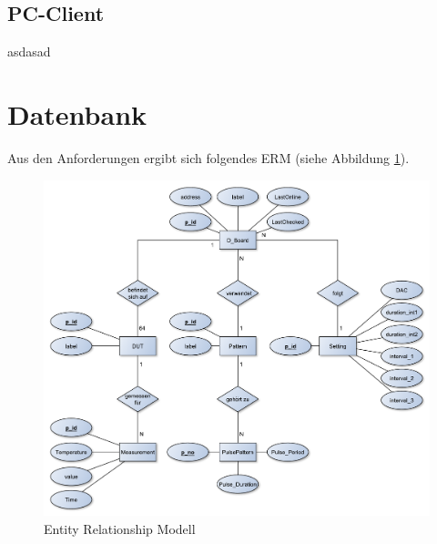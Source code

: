 
\newpage



\newpage
\subsection{PC-Client}
\label{section_Verwaltung}
asdasad

\newpage



\newpage
\section{Datenbank}
\label{section_EntwurfDatenbank}

Aus den Anforderungen ergibt sich folgendes \ac{ERM} (siehe Abbildung \ref{ERM}). \\

\begin{figure}[H]
\begin{center}
\includegraphics[width=\textwidth]{img/general/ER_Diagramm.pdf}
\caption{Entity Relationship Modell}
\label{ERM}
\end{center}
\end{figure}


